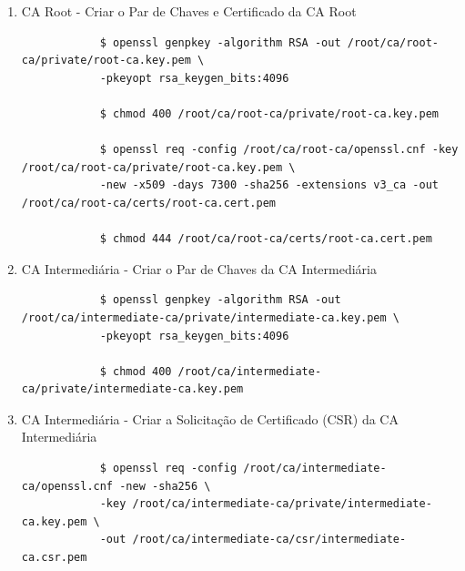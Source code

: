 \documentclass{article}
\begin{document}
\begin{enumerate}
\begin{tcolorbox}[width=\textwidth, enhanced, breakable]
{\begin{verbatim}
			[ v3_intermediate_ca ]
			subjectKeyIdentifier = hash
			authorityKeyIdentifier = keyid:always,issuer
			basicConstraints = critical,CA:true,pathlen:0
			keyUsage = critical, digitalSignature, cRLSign, keyCertSign
			
			[ crl_ext ]
			authorityKeyIdentifier=keyid:always
			
			[ usr_cert ]
			basicConstraints = CA:FALSE
			nsCertType = client, email
			nsComment = "User Certificate"
			subjectKeyIdentifier = hash
			authorityKeyIdentifier = keyid,issuer
			keyUsage = critical, nonRepudiation, digitalSignature, keyEncipherment
			extendedKeyUsage = clientAuth, emailProtection
		\end{verbatim}
	}
	\end{tcolorbox}

	\item CA Root - Criar o Par de Chaves e Certificado da CA Root
	\begin{tcolorbox}[width=\textwidth]
	{\footnotesize
		\begin{verbatim}
			$ openssl genpkey -algorithm RSA -out /root/ca/root-ca/private/root-ca.key.pem \
			-pkeyopt rsa_keygen_bits:4096

			$ chmod 400 /root/ca/root-ca/private/root-ca.key.pem
			
			$ openssl req -config /root/ca/root-ca/openssl.cnf -key /root/ca/root-ca/private/root-ca.key.pem \
			-new -x509 -days 7300 -sha256 -extensions v3_ca -out /root/ca/root-ca/certs/root-ca.cert.pem

			$ chmod 444 /root/ca/root-ca/certs/root-ca.cert.pem
		\end{verbatim}
	}
	\end{tcolorbox}

	\item CA Intermediária - Criar o Par de Chaves da CA Intermediária
	\begin{tcolorbox}[width=\textwidth]
	{\footnotesize
		\begin{verbatim}
			$ openssl genpkey -algorithm RSA -out /root/ca/intermediate-ca/private/intermediate-ca.key.pem \
			-pkeyopt rsa_keygen_bits:4096

			$ chmod 400 /root/ca/intermediate-ca/private/intermediate-ca.key.pem
		\end{verbatim}
	}
	\end{tcolorbox}

	\item CA Intermediária - Criar a Solicitação de Certificado (CSR) da CA Intermediária
	\begin{tcolorbox}[width=\textwidth]
	{\footnotesize
		\begin{verbatim}
			$ openssl req -config /root/ca/intermediate-ca/openssl.cnf -new -sha256 \
			-key /root/ca/intermediate-ca/private/intermediate-ca.key.pem \
			-out /root/ca/intermediate-ca/csr/intermediate-ca.csr.pem
		\end{verbatim}
	}
	\end{tcolorbox}


\end{enumerate}
\end{document}
